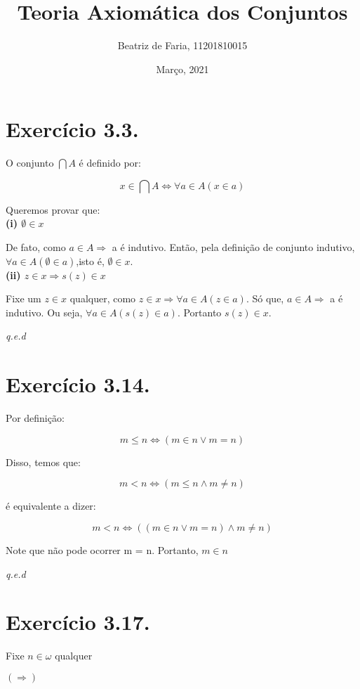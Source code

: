 \documentclass[12pt]{extarticle}
\title{Teoria Axiomática dos Conjuntos}
\author{Beatriz de Faria, 11201810015}
\date{Março, 2021}
\newcommand{\fim}{\begin{flushright}

   \emph{q.e.d}
\end{flushright}}
\begin{document}
\maketitle

\section{Exercício 3.3.}

O conjunto $\bigcap A$ é definido por:

$$
x \in \bigcap A \Leftrightarrow \forall a \in A (x \in a)
$$

Queremos provar que:\\

\textbf{(i) $\emptyset \in x$}

De fato, como $ a \in A \Rightarrow$ a é indutivo. Então, pela definição de conjunto indutivo, $\forall a \in A (\emptyset \in a)$,isto é, $\emptyset \in x$. \\

\textbf{(ii) $z \in x \Rightarrow s(z) \in x$}

Fixe um $z \in x$ qualquer, como $z \in x \Rightarrow \forall a \in A (z \in a).$ Só que, $ a \in A \Rightarrow$ a é indutivo. Ou seja, $\forall a \in A (s(z) \in a)$. Portanto $s(z) \in x$.

\fim

\section{Exercício 3.14.}

Por definição:

$$
m \leq n \Leftrightarrow (m \in n \lor m = n)
$$

Disso, temos que:

$$
m < n \Leftrightarrow (m \leq n \land m \neq n)
$$

é equivalente a dizer:

$$
m < n \Leftrightarrow ((m \in n \lor m = n) \land m \neq n)
$$

Note que não pode ocorrer m = n. Portanto, $m \in n$

\fim

\section{Exercício 3.17.}

Fixe $n \in \omega$ qualquer

$(\Rightarrow)$ 
\end{document}
